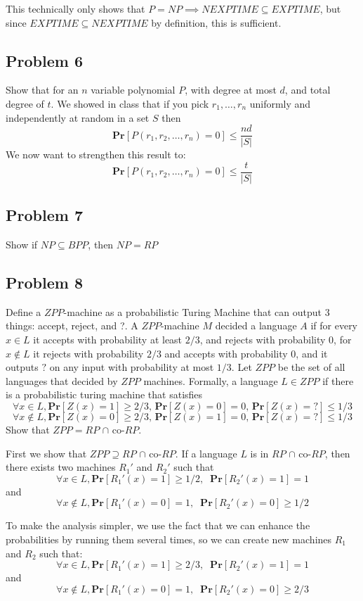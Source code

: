 \documentclass[english]{article}
\begin{document}
This technically only shows that $P = NP \implies NEXPTIME \subseteq EXPTIME$, but since
$EXPTIME \subseteq NEXPTIME$ by definition, this is sufficient. 

\subsection*{Problem 6}
Show that for an $n$ variable polynomial $P$, with degree at most $d$, and total degree of $t$. We showed in class
that if you pick $r_1, \ldots, r_n$ uniformly and independently at random in a set $S$ then 
\[ \mathbf{Pr}[P(r_1,r_2,\ldots,r_n) = 0] \le \frac{nd}{|S|} \]
We now want to strengthen this result to:
\[ \mathbf{Pr}[P(r_1,r_2,\ldots,r_n) = 0] \le \frac{t}{|S|} \]


\subsection*{Problem 7}
Show if $NP \subseteq BPP$, then $NP = RP$

\subsection*{Problem 8}
Define a $ZPP$-machine as a probabilistic Turing Machine that can output 3 things: accept, reject, and ?.
A $ZPP$-machine $M$ decided a language $A$ if for every $x \in L$ it accepts with probability at least $2/3$, and
rejects with probability 0, for $x \notin L$ it rejects with probability $2/3$ and accepts with probability 0, and it
outputs $?$ on any input with probability at most $1/3$. Let $ZPP$ be the set of all languages that decided by
$ZPP$ machines. Formally, a language $L \in ZPP$ if there is a probabilistic turing machine that satisfies
\[\forall x \in L, \mathbf{Pr}[Z(x) = 1] \ge 2/3,\,\mathbf{Pr}[Z(x) = 0] = 0,\,\mathbf{Pr}[Z(x) = ?] \le 1/3 \]
\[\forall x \notin L, \mathbf{Pr}[Z(x) = 0] \ge 2/3,\,\mathbf{Pr}[Z(x) = 1] = 0,\,\mathbf{Pr}[Z(x) = ?] \le 1/3\]
Show that $ZPP = RP$ $\cap$ co-$RP$.

First we show that $ZPP \supseteq RP$ $\cap$ co-$RP$. 
If a language $L$ is in $RP$ $\cap$ co-$RP$, then there exists two machines $R_1'$ and $R_2'$ such that
\[\forall x \in L, \mathbf{Pr}[R_1'(x) = 1] \ge 1/2, \;\; \mathbf{Pr}[R_2'(x) = 1] = 1\]
and
\[\forall x \notin L, \mathbf{Pr}[R_1'(x) = 0] = 1, \;\; \mathbf{Pr}[R_2'(x) = 0] \ge 1/2\]

To make the analysis simpler, we use the fact that we can enhance the probabilities by running them several times,
so we can create new machines $R_1$ and $R_2$ such that:
\[\forall x \in L, \mathbf{Pr}[R_1'(x) = 1] \ge 2/3, \;\; \mathbf{Pr}[R_2'(x) = 1] = 1\]
and
\[\forall x \notin L, \mathbf{Pr}[R_1'(x) = 0] = 1, \;\; \mathbf{Pr}[R_2'(x) = 0] \ge 2/3\]
\end{document}

